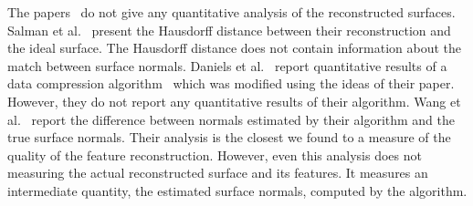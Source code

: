 The papers~\cite{avron2010L,dgqsww-fprss-12,fcs-rmlsf-2005,Oztireli2009}
do not give any quantitative analysis of the reconstructed surfaces.
Salman et al.~\cite{sym-fpmg-10} present the Hausdorff distance
between their reconstruction and the ideal surface.
The Hausdorff distance does not contain information
about the match between surface normals.
Daniels et al.~\cite{Daniels:2007:Robust} report quantitative
results of a data compression algorithm~\cite{Ochotta:2004:Compression}
which was modified using the ideas of their paper.
However, they do not report any quantitative results of their algorithm.
Wang et al.~\cite{Wang:2013:Feature} report the difference 
between normals estimated by their algorithm and the true surface normals.
Their analysis is the closest we found to a measure
of the quality of the feature reconstruction.
However, even this analysis 
does not measuring the actual reconstructed surface and its features.
It measures an intermediate quantity,
the estimated surface normals, computed by the algorithm.
